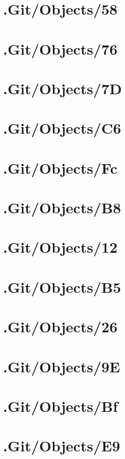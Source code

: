 \section*{.Git/Objects/58}

\section*{.Git/Objects/76}

\section*{.Git/Objects/7D}

\section*{.Git/Objects/C6}

\section*{.Git/Objects/Fc}

\section*{.Git/Objects/B8}

\section*{.Git/Objects/12}

\section*{.Git/Objects/B5}

\section*{.Git/Objects/26}

\section*{.Git/Objects/9E}

\section*{.Git/Objects/Bf}

\section*{.Git/Objects/E9}

